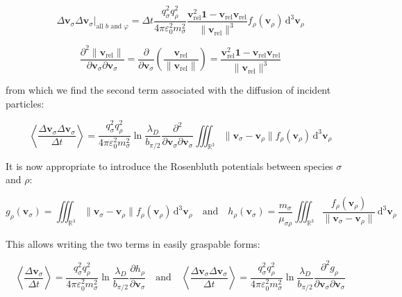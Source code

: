 \begin{equation}
    \Delta\mathbf{v}_\sigma\Delta\mathbf{v}_\sigma\Bigr|_{\text{all }b\text{ and }\varphi}=\Delta t\frac{q_\sigma ^2q_\rho ^2}{4\pi\varepsilon_0^2m_\sigma ^2}\frac{\mathbf{v}_\text{rel}^2\mathbf{1}-\mathbf{v}_\text{rel}\mathbf{v}_\text{rel}}{\|\mathbf{v}_\text{rel}\|^3}f_\rho (\mathbf{v}_\rho )\,\mathrm{d}^3\mathbf{v}_\rho 
\end{equation}

\begin{equation}
    \frac{\partial^2\|\mathbf{v}_\text{rel}\|}{\partial\mathbf{v}_\sigma \partial\mathbf{v}_\sigma }=\frac{\partial}{\partial\mathbf{v}_\sigma }\left(\frac{\mathbf{v}_\text{rel}}{\|\mathbf{v}_\text{rel}\|}\right)=\frac{\mathbf{v}_\text{rel}^2\mathbf{1}-\mathbf{v}_\text{rel}\mathbf{v}_\text{rel}}{\|\mathbf{v}_\text{rel}\|^3}
\end{equation}

from which we find the second term associated with the diffusion of incident particles:

\begin{equation}
    \left\langle\frac{\Delta\mathbf{v}_\sigma\Delta\mathbf{v}_\sigma}{\Delta t}\right\rangle=\frac{q_\sigma ^2q_\rho ^2}{4\pi\varepsilon_0^2 m_\sigma ^2}\ln{\frac{\lambda_D}{b_{\pi/2}}}\frac{\partial^2}{\partial\mathbf{v}_\sigma\partial\mathbf{v}_\sigma}\iiint_{\mathbb{R}^3}\|\mathbf{v}_\sigma-\mathbf{v}_\rho\|f_\rho(\mathbf{v}_\rho)\,\mathrm{d}^3\mathbf{v}_\rho
\end{equation}

It is now appropriate to introduce the Rosenbluth potentials between species $\sigma$ and $\rho$:

\begin{equation}
    g_\rho(\mathbf{v}_\sigma)=\iiint_{\mathbb{R}^3}\|\mathbf{v}_\sigma-\mathbf{v}_\rho\|f_\rho(\mathbf{v}_\rho)\,\mathrm{d}^3\mathbf{v}_\rho\quad\text{and}\quad h_\rho(\mathbf{v}_\sigma)=\frac{m_\sigma}{\mu_{\sigma\rho}}\iiint_{\mathbb{R}^3}\frac{f_\rho(\mathbf{v}_\rho)}{\|\mathbf{v}_\sigma-\mathbf{v}_\rho\|}\,\mathrm{d}^3\mathbf{v}_\rho
\end{equation}

This allows writing the two terms in easily graspable forms:

\begin{equation}
    \left\langle\frac{\Delta\mathbf{v}_\sigma}{\Delta t}\right\rangle=\frac{q_\sigma^2 q_\rho^2}{4\pi\varepsilon_0^2m_\sigma^2}\ln{\frac{\lambda_D}{b_{\pi/2}}}\frac{\partial h_\rho}{\partial\mathbf{v}_\sigma}\quad\text{and}\quad\left\langle\frac{\Delta\mathbf{v}_\sigma\Delta\mathbf{v}_\sigma}{\Delta t}\right\rangle=\frac{q_\sigma^2q_\rho^2}{4\pi\varepsilon_0^2m_\sigma^2}\ln{\frac{\lambda_D}{b_{\pi/2}}}\frac{\partial^2g_\rho}{\partial\mathbf{v}_\sigma\partial\mathbf{v}_\sigma}
\end{equation}

